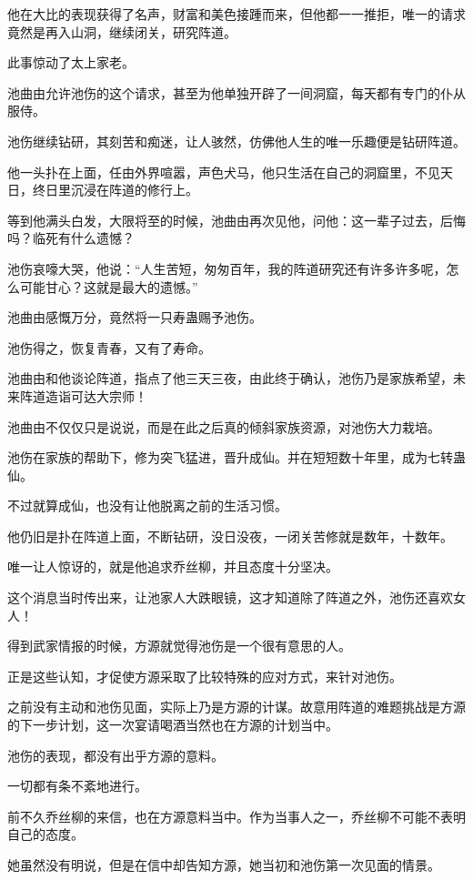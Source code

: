 \begin{this_body}
他在大比的表现获得了名声，财富和美色接踵而来，但他都一一推拒，唯一的请求竟然是再入山洞，继续闭关，研究阵道。

此事惊动了太上家老。

池曲由允许池伤的这个请求，甚至为他单独开辟了一间洞窟，每天都有专门的仆从服侍。

池伤继续钻研，其刻苦和痴迷，让人骇然，仿佛他人生的唯一乐趣便是钻研阵道。

他一头扑在上面，任由外界喧嚣，声色犬马，他只生活在自己的洞窟里，不见天日，终日里沉浸在阵道的修行上。

等到他满头白发，大限将至的时候，池曲由再次见他，问他：这一辈子过去，后悔吗？临死有什么遗憾？

池伤哀嚎大哭，他说：“人生苦短，匆匆百年，我的阵道研究还有许多许多呢，怎么可能甘心？这就是最大的遗憾。”

池曲由感慨万分，竟然将一只寿蛊赐予池伤。

池伤得之，恢复青春，又有了寿命。

池曲由和他谈论阵道，指点了他三天三夜，由此终于确认，池伤乃是家族希望，未来阵道造诣可达大宗师！

池曲由不仅仅只是说说，而是在此之后真的倾斜家族资源，对池伤大力栽培。

池伤在家族的帮助下，修为突飞猛进，晋升成仙。并在短短数十年里，成为七转蛊仙。

不过就算成仙，也没有让他脱离之前的生活习惯。

他仍旧是扑在阵道上面，不断钻研，没日没夜，一闭关苦修就是数年，十数年。

唯一让人惊讶的，就是他追求乔丝柳，并且态度十分坚决。

这个消息当时传出来，让池家人大跌眼镜，这才知道除了阵道之外，池伤还喜欢女人！

得到武家情报的时候，方源就觉得池伤是一个很有意思的人。

正是这些认知，才促使方源采取了比较特殊的应对方式，来针对池伤。

之前没有主动和池伤见面，实际上乃是方源的计谋。故意用阵道的难题挑战是方源的下一步计划，这一次宴请喝酒当然也在方源的计划当中。

池伤的表现，都没有出乎方源的意料。

一切都有条不紊地进行。

前不久乔丝柳的来信，也在方源意料当中。作为当事人之一，乔丝柳不可能不表明自己的态度。

她虽然没有明说，但是在信中却告知方源，她当初和池伤第一次见面的情景。


\end{this_body}
